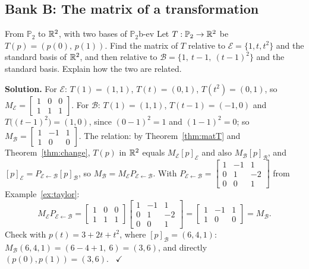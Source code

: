 \documentclass[11pt]{article}
\begin{document}
\subsection*{Bank B: The matrix of a transformation}
\begin{exmp}{From $\mathbb{P}_2$ to $\mathbb{R}^2$, with two bases of $\mathbb{P}_2$}{b-ev}
Let $T:\mathbb{P}_2\to\mathbb{R}^2$ be $T(p)=(p(0),\,p(1))$. Find the matrix of $T$ relative to $\mathcal{E}=\{1,t,t^2\}$ and the standard basis of $\mathbb{R}^2$, and then relative to $\mathcal{B}=\{1,\ t-1,\ (t-1)^2\}$ and the standard basis. Explain how the two are related.

\textbf{Solution.} For $\mathcal{E}$: $T(1)=(1,1)$, $T(t)=(0,1)$, $T(t^2)=(0,1)$, so $M_{\mathcal{E}}=\begin{bmatrix}1&0&0\\1&1&1\end{bmatrix}$. For $\mathcal{B}$: $T(1)=(1,1)$, $T(t-1)=(-1,0)$ and $T\bigl((t-1)^2\bigr)=(1,0)$, since $(0-1)^2=1$ and $(1-1)^2=0$; so $M_{\mathcal{B}}=\begin{bmatrix}1&-1&1\\1&0&0\end{bmatrix}$. The relation: by Theorem~\ref{thm:matT} and Theorem~\ref{thm:change}, $T(p)$ in $\mathbb{R}^2$ equals $M_{\mathcal{E}}[p]_{\mathcal{E}}$ and also $M_{\mathcal{B}}[p]_{\mathcal{B}}$, and $[p]_{\mathcal{E}}=P_{\mathcal{E}\leftarrow\mathcal{B}}[p]_{\mathcal{B}}$, so $M_{\mathcal{B}}=M_{\mathcal{E}}P_{\mathcal{E}\leftarrow\mathcal{B}}$. With $P_{\mathcal{E}\leftarrow\mathcal{B}}=\begin{bmatrix}1&-1&1\\0&1&-2\\0&0&1\end{bmatrix}$ from Example~\ref{ex:taylor}:
\[
M_{\mathcal{E}}P_{\mathcal{E}\leftarrow\mathcal{B}}=\begin{bmatrix}1&0&0\\1&1&1\end{bmatrix}\begin{bmatrix}1&-1&1\\0&1&-2\\0&0&1\end{bmatrix}=\begin{bmatrix}1&-1&1\\1&0&0\end{bmatrix}=M_{\mathcal{B}}.
\]
Check with $p(t)=3+2t+t^2$, where $[p]_{\mathcal{B}}=(6,4,1)$: $M_{\mathcal{B}}(6,4,1)=(6-4+1,\ 6)=(3,6)$, and directly $(p(0),p(1))=(3,6)$. \ $\checkmark$
\end{exmp}
\end{document}
